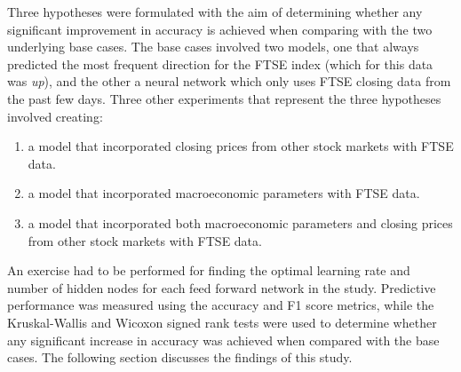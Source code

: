 \documentclass{UoYCSproject}
\begin{document}
Three hypotheses were formulated with the aim of determining whether any significant improvement in accuracy is achieved when comparing with the two underlying base cases. The base cases involved two models, one that always predicted the most frequent direction for the FTSE index (which for this data was \textit{up}), and the other a neural network which only uses FTSE closing data from the past few days. Three other experiments that represent the three hypotheses involved creating:
\begin{enumerate}
    \item a model that incorporated closing prices from other stock markets with FTSE data.
    \item a model that incorporated macroeconomic parameters with FTSE data.
    \item a model that incorporated both macroeconomic parameters and closing prices from other stock markets with FTSE data. 
\end{enumerate}

An exercise had to be performed for finding the optimal learning rate and number of hidden nodes for each feed forward network in the study. Predictive performance was measured using the accuracy and F1 score metrics, while the Kruskal-Wallis and Wicoxon signed rank tests were used to determine whether any significant increase in accuracy was achieved when compared with the base cases. The following section discusses the findings of this study.
\end{document}
